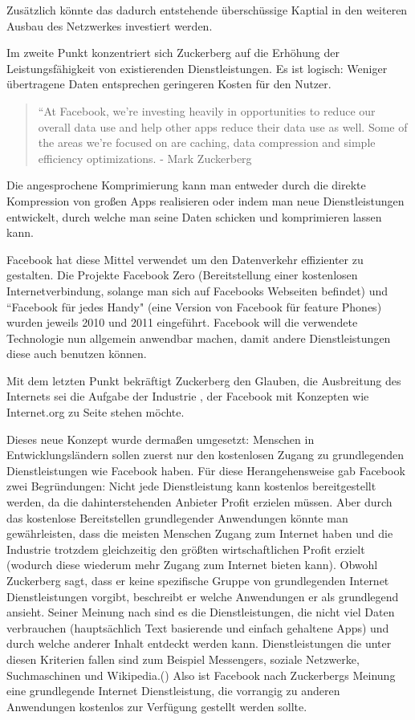 \documentclass{article}
\begin{document}
Zusätzlich könnte das dadurch entstehende überschüssige Kaptial in den weiteren Ausbau des Netzwerkes investiert werden.

\medskip

Im zweite Punkt konzentriert sich Zuckerberg auf die Erhöhung der Leistungsfähigkeit von existierenden Dienstleistungen.
Es ist logisch: Weniger übertragene Daten entsprechen geringeren Kosten für den Nutzer.

\begin{quote}
``At Facebook, we’re investing heavily in opportunities to reduce our overall data use and help  other apps     
reduce their data use as well. Some of the areas we’re focused on are caching, data compression and simple efficiency optimizations.
- Mark Zuckerberg \textcite[8]{HumanRight}
\end{quote}

Die angesprochene Komprimierung kann man entweder durch die direkte Kompression von großen Apps realisieren oder indem man neue Dienstleistungen entwickelt, durch welche man seine Daten schicken und komprimieren lassen kann.

Facebook hat diese Mittel verwendet um den Datenverkehr effizienter zu gestalten.
Die Projekte Facebook Zero (Bereitstellung einer kostenlosen Internetverbindung, solange man sich auf Facebooks Webseiten befindet) und ``Facebook für jedes Handy" (eine Version von Facebook für feature Phones) wurden jeweils  2010 und 2011 eingeführt.
Facebook will die verwendete Technologie nun allgemein anwendbar machen, damit andere Dienstleistungen diese auch benutzen können.

\medskip

Mit dem letzten Punkt bekräftigt Zuckerberg den Glauben, die Ausbreitung des Internets sei die Aufgabe der Industrie , der Facebook mit Konzepten wie Internet.org zu Seite stehen möchte.

Dieses neue Konzept wurde dermaßen umgesetzt: Menschen in Entwicklungsländern sollen zuerst nur den kostenlosen Zugang zu grundlegenden Dienstleistungen wie Facebook haben.
Für diese Herangehensweise gab Facebook zwei Begründungen:
\medskip
Nicht jede Dienstleistung kann kostenlos bereitgestellt werden, da die dahinterstehenden Anbieter Profit erzielen müssen. 
Aber durch das kostenlose Bereitstellen grundlegender Anwendungen könnte man gewährleisten, dass die meisten Menschen Zugang zum Internet haben und die Industrie trotzdem gleichzeitig den größten wirtschaftlichen Profit erzielt (wodurch diese wiederum mehr Zugang zum Internet bieten kann).
Obwohl Zuckerberg sagt, dass er keine spezifische Gruppe von grundlegenden Internet Dienstleistungen vorgibt, beschreibt er welche Anwendungen er als grundlegend ansieht.
Seiner Meinung nach sind es die Dienstleistungen, die nicht viel Daten verbrauchen (hauptsächlich Text basierende und einfach gehaltene Apps) und durch welche anderer Inhalt entdeckt werden kann.
Dienstleistungen die unter diesen Kriterien fallen sind zum Beispiel Messengers, soziale Netzwerke, Suchmaschinen und Wikipedia.(\cite[5]{HumanRight})
Also ist Facebook nach Zuckerbergs Meinung eine grundlegende Internet Dienstleistung, die vorrangig zu anderen Anwendungen kostenlos zur Verfügung gestellt werden sollte.
\end{document}
